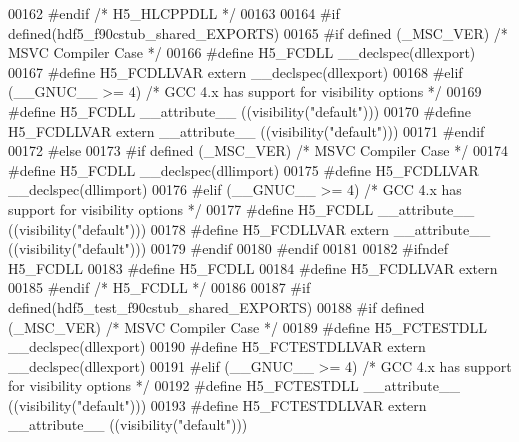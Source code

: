\begin{DoxyCode}
00162 \textcolor{preprocessor}{#endif }\textcolor{comment}{/* H5\_HLCPPDLL */}\textcolor{preprocessor}{}
00163 
00164 \textcolor{preprocessor}{#if defined(hdf5\_f90cstub\_shared\_EXPORTS)}
00165 \textcolor{preprocessor}{  #if defined (\_MSC\_VER)  }\textcolor{comment}{/* MSVC Compiler Case */}\textcolor{preprocessor}{}
00166 \textcolor{preprocessor}{    #define H5\_FCDLL \_\_declspec(dllexport)}
00167 \textcolor{preprocessor}{    #define H5\_FCDLLVAR extern \_\_declspec(dllexport)}
00168 \textcolor{preprocessor}{  #elif (\_\_GNUC\_\_ >= 4)  }\textcolor{comment}{/* GCC 4.x has support for visibility options */}\textcolor{preprocessor}{}
00169 \textcolor{preprocessor}{    #define H5\_FCDLL \_\_attribute\_\_ ((visibility("default")))}
00170 \textcolor{preprocessor}{    #define H5\_FCDLLVAR extern \_\_attribute\_\_ ((visibility("default")))}
00171 \textcolor{preprocessor}{  #endif}
00172 \textcolor{preprocessor}{#else}
00173 \textcolor{preprocessor}{  #if defined (\_MSC\_VER)  }\textcolor{comment}{/* MSVC Compiler Case */}\textcolor{preprocessor}{}
00174 \textcolor{preprocessor}{    #define H5\_FCDLL \_\_declspec(dllimport)}
00175 \textcolor{preprocessor}{    #define H5\_FCDLLVAR \_\_declspec(dllimport)}
00176 \textcolor{preprocessor}{  #elif (\_\_GNUC\_\_ >= 4)  }\textcolor{comment}{/* GCC 4.x has support for visibility options */}\textcolor{preprocessor}{}
00177 \textcolor{preprocessor}{    #define H5\_FCDLL \_\_attribute\_\_ ((visibility("default")))}
00178 \textcolor{preprocessor}{    #define H5\_FCDLLVAR extern \_\_attribute\_\_ ((visibility("default")))}
00179 \textcolor{preprocessor}{  #endif}
00180 \textcolor{preprocessor}{#endif}
00181 
00182 \textcolor{preprocessor}{#ifndef H5\_FCDLL}
00183 \textcolor{preprocessor}{  #define H5\_FCDLL}
00184 \textcolor{preprocessor}{  #define H5\_FCDLLVAR extern}
00185 \textcolor{preprocessor}{#endif }\textcolor{comment}{/* H5\_FCDLL */}\textcolor{preprocessor}{}
00186 
00187 \textcolor{preprocessor}{#if defined(hdf5\_test\_f90cstub\_shared\_EXPORTS)}
00188 \textcolor{preprocessor}{  #if defined (\_MSC\_VER)  }\textcolor{comment}{/* MSVC Compiler Case */}\textcolor{preprocessor}{}
00189 \textcolor{preprocessor}{    #define H5\_FCTESTDLL \_\_declspec(dllexport)}
00190 \textcolor{preprocessor}{    #define H5\_FCTESTDLLVAR extern \_\_declspec(dllexport)}
00191 \textcolor{preprocessor}{  #elif (\_\_GNUC\_\_ >= 4)  }\textcolor{comment}{/* GCC 4.x has support for visibility options */}\textcolor{preprocessor}{}
00192 \textcolor{preprocessor}{    #define H5\_FCTESTDLL \_\_attribute\_\_ ((visibility("default")))}
00193 \textcolor{preprocessor}{    #define H5\_FCTESTDLLVAR extern \_\_attribute\_\_ ((visibility("default")))}

\end{DoxyCode}
